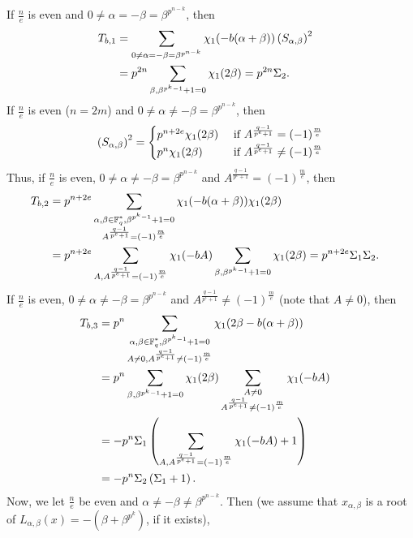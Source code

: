 \documentclass[11pt]{article}
\def\F{{\mathbb F}}
\def\\{\cr}
\begin{document}
If   $\frac{n}{e}$ is even and $0\neq \alpha=-\beta= \beta^{p^{n-k}}$, then
\begin{align*}
T_{b,1}&= \sum_{0\neq \alpha=-\beta= \beta^{p^{n-k}}}\chi_1(-b(\alpha+\beta)) \left(S_{\alpha,\beta}\right)^2  \\ 
&=p^{2n} \sum_{\beta,\beta^{p^k-1}+1=0} \chi_1(2\beta)=p^{2n}  \Sigma_2.
\end{align*}
If $\frac{n}{e}$ is even ($n=2m$) and $0\neq \alpha\neq -\beta= \beta^{p^{n-k}}$, then
\begin{align*}
\left(S_{\alpha,\beta}\right)^2  = 
\begin{cases} 
p^{n+2e}\chi_1(2\beta) &\text{ if } A^{\frac{q-1}{p^e+1}}=(-1)^{\frac{m}{e}}\\
p^{n}\chi_1(2\beta)  &\text{ if } A^{\frac{q-1}{p^e+1}}\neq (-1)^{\frac{m}{e}}
\end{cases}
\end{align*}
Thus, if $\frac{n}{e}$ is even, $0\neq \alpha\neq -\beta= \beta^{p^{n-k}}$ and $A^{\frac{q-1}{p^e+1}}= (-1)^{\frac{m}{e}}$,  then 
\begin{align*}
T_{b,2}&=p^{n+2e} \sum_{\substack{\alpha,\beta\in\F_q^*,\beta^{p^k-1}+1=0 \\ A^{\frac{q-1}{p^e+1}}= (-1)^{\frac{m}{e}}}} \chi_1(-b(\alpha+\beta)) \chi_1(2\beta)\\
&=p^{n+2e} \sum_{A,A^{\frac{q-1}{p^e+1}}=(-1)^{\frac{m}{e}}} \chi_1(-bA)  \sum_{\beta,\beta^{p^k-1}+1=0} \chi_1(2\beta)=p^{n+2e}\Sigma_1\Sigma_2.
\end{align*}
If $ \frac{n}{e}$ is even, $0\neq \alpha\neq -\beta= \beta^{p^{n-k}}$ and $A^{\frac{q-1}{p^e+1}}\neq  (-1)^{\frac{m}{e}}$  (note that $A\neq 0$), then
\begin{align*}
T_{b,3}&=p^{n} \sum_{\substack{\alpha,\beta\in\F_q^*,\beta^{p^k-1}+1=0 \\ A\neq 0,A^{\frac{q-1}{p^e+1}}\neq (-1)^{\frac{m}{e}}}}  \chi_1(2\beta-b(\alpha+\beta)) \\
&=p^n \sum_{\beta,\beta^{p^k-1}+1=0} \chi_1(2\beta) \sum_{\substack{A\neq 0\\ A^{\frac{q-1}{p^e+1}}\neq (-1)^{\frac{m}{e}}}} \chi_1(-bA)\\
&=  -p^n\Sigma_1  \left(\sum_{A,A^{\frac{q-1}{p^e+1}}=(-1)^{\frac{m}{e}}} \chi_1(-bA)+1 \right)\\
&=-p^n\Sigma_2\left(\Sigma_1+1 \right).
\end{align*}
Now, we let   $\frac{n}{e}$ be even and $\alpha\neq-\beta\neq \beta^{p^{n-k}}$. Then (we assume that $x_{\alpha,\beta}$ is a root of $L_{\alpha,\beta}(x)=-(\beta+\beta^{p^k})$, if it exists),
\end{document}

